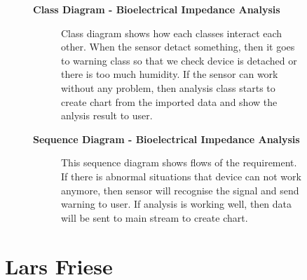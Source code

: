 \documentclass{article}
\begin{document}
		\begin{figure}[htbp]
			\textbf{Class Diagram - Bioelectrical Impedance Analysis}
			\centering
			\begin{subfigure}{\textwidth}
				\resizebox{\textwidth}{!}{}
			\end{subfigure}
			\begin{subfigure}{\textwidth}
				Class diagram shows how each classes interact each other. When the sensor detact something, then it goes to warning class so that we check device is detached or there is too much humidity. If the sensor can work without any problem, then analysis class starts to create chart from the imported data and show the anlysis result to user.
			\end{subfigure}
		\end{figure}
		\clearpage
		
		\begin{figure}[htbp]
			\textbf{Sequence Diagram - Bioelectrical Impedance Analysis}
			\centering
			\begin{subfigure}{\textwidth}
				\centering
				\scalebox{0.7}{}
			\end{subfigure}
			\begin{subfigure}{\textwidth}
				This sequence diagram shows flows of the requirement. If there is abnormal situations that device can not work anymore, then sensor will recognise the signal and send warning to user. If analysis is working well, then data will be sent to main stream to create chart.
			\end{subfigure}
		\end{figure}
		\clearpage   


\section{Lars Friese}
\end{document}
